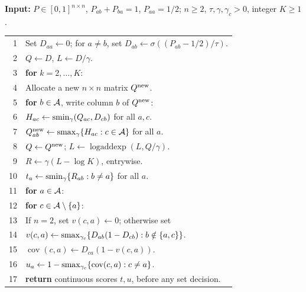 \begin{algorithm}[t]
\caption{Canonical STE-LSE forward pass}\label{alg:lse}
\small
\noindent\textbf{Input:} $P\in[0,1]^{n\times n}$, $P_{ab}+P_{ba}=1$, $P_{aa}=1/2$; $n\ge2$, $\tau,\gamma,\gamma_c>0$, integer $K\ge1$.
\par\smallskip
\begingroup
\setlength{\tabcolsep}{0pt}
\renewcommand{\arraystretch}{1.02}
\begin{tabular}{@{}r@{\hspace{0.55em}}p{\dimexpr\linewidth-2em\relax}@{}}
1 & Set $D_{aa}\gets0$; for $a\ne b$, set $D_{ab}\gets\sigma((P_{ab}-1/2)/\tau)$.\\
2 & $Q\gets D$, $L\gets D/\gamma$.\\
3 & \textbf{for} $k=2,\ldots,K$:\\
4 & \quad Allocate a new $n\times n$ matrix $Q^{\rm new}$.\\
5 & \quad\textbf{for} $b\in\mathcal{A}$, write column $b$ of $Q^{\rm new}$:\\
6 & \qquad $H_{ac}\gets\operatorname{smin}_\gamma(Q_{ac},D_{cb})$ for all $a,c$.\\
7 & \qquad $Q^{\rm new}_{ab}\gets\operatorname{smax}_\gamma\{H_{ac}:c\in\mathcal{A}\}$ for all $a$.\\
8 & \quad $Q\gets Q^{\rm new}$; $L\gets\operatorname{logaddexp}(L,Q/\gamma)$.\\
9 & $R\gets\gamma(L-\log K)$, entrywise.\\
10 & $t_a\gets\operatorname{smin}_\gamma\{R_{ab}:b\ne a\}$ for all $a$.\\
11 & \textbf{for} $a\in\mathcal{A}$:\\
12 & \quad\textbf{for} $c\in\mathcal{A}\setminus\{a\}$:\\
13 & \qquad If $n=2$, set $v(c,a)\gets0$; otherwise set\\
14 & \qquad $v(c,a)\gets\operatorname{smax}_{\gamma_c}\{D_{ab}(1-D_{cb}):b\notin\{a,c\}\}$.\\
15 & \qquad $\operatorname{cov}(c,a)\gets D_{ca}(1-v(c,a))$.\\
16 & \quad $u_a\gets1-\operatorname{smax}_{\gamma_c}\{\operatorname{cov}(c,a):c\ne a\}$.\\
17 & \textbf{return} continuous scores $t,u$, before any set decision.\\
\end{tabular}
\endgroup
\end{algorithm}
